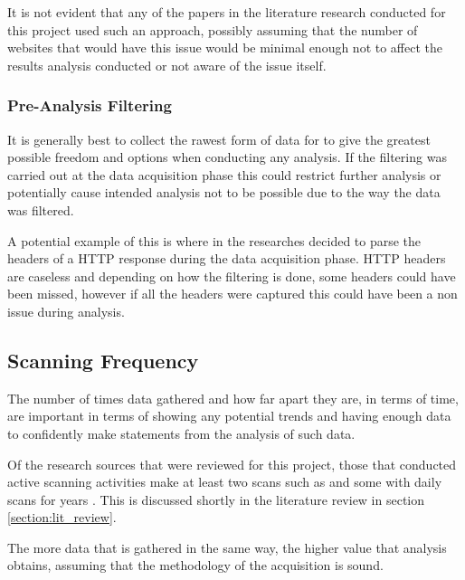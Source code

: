 \documentclass{mscreport}
\begin{document}
\vspace{0.3cm} \noindent
It is not evident that any of the papers in the literature research conducted for this project used such an approach, possibly assuming that the number of websites that would have this issue would be minimal enough not to affect the results analysis conducted or not aware of the issue itself.

\subsubsection{Pre-Analysis Filtering}
It is generally best to collect the rawest form of data for to give the greatest possible freedom and options when conducting any analysis. If the filtering was carried out at the data acquisition phase this could restrict further analysis or potentially cause intended analysis not to be possible due to the way the data was filtered.

\vspace{0.3cm} \noindent
A potential example of this is where in \cite{Buchanan2018-xz} the researches decided to parse the headers of a HTTP response during the data acquisition phase. HTTP headers are caseless \cite{Berners-Lee1996-ji} and depending on how the filtering is done, some headers could have been missed, however if all the headers were captured this could have been a non issue during analysis.

\subsection{Scanning Frequency}

The number of times data gathered and how far apart they are, in terms of time, are important in terms of showing any potential trends and having enough data to confidently make statements from the analysis of such data.

\vspace{0.3cm} \noindent
Of the research sources that were reviewed for this project, those that conducted active scanning activities make at least two scans such as \cite{Buchanan2018-xz,Amann2017-co,Chen2016-dl,Kumar2017-qw} and some with daily scans for years \cite{Holz2020-ha}. This is discussed shortly in the literature review in section \ref{section:lit_review}.

\vspace{0.3cm} \noindent
The more data that is gathered in the same way, the higher value that analysis obtains, assuming that the methodology of the acquisition is sound.
\end{document}
